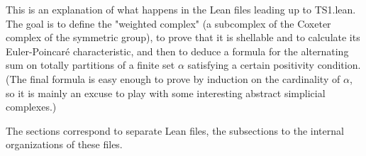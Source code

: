 



This is an explanation of what happens in the Lean files leading up to TS1.lean. The goal is to define the "weighted complex" (a subcomplex of the Coxeter complex of the
symmetric group), to prove that it is shellable and to calculate its Euler-Poincaré characteristic, and then to deduce a formula for the alternating sum on totally partitions
of a finite set $\alpha$ satisfying a certain positivity condition. (The final formula is easy enough to prove by induction on the cardinality of $\alpha$, so it is mainly
an excuse to play with some interesting abstract simplicial complexes.)


The sections correspond to separate Lean files, the subsections to the
internal organizations of these files.















